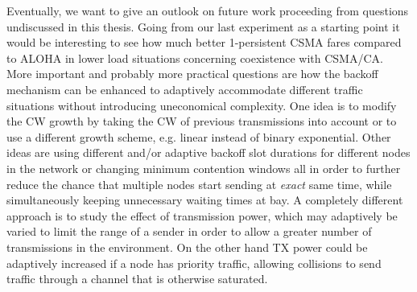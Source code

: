 Eventually, we want to give an outlook on future work proceeding from questions undiscussed in this thesis. Going from our last experiment as a starting point it would be interesting to see how much better 1-persistent CSMA fares compared to ALOHA in lower load situations concerning coexistence with CSMA/CA. More important and probably more practical questions are how the backoff mechanism can be enhanced to adaptively accommodate different traffic situations without introducing uneconomical complexity. One idea is to modify the CW growth by taking the CW of previous transmissions into account or to use a different growth scheme, e.g. linear instead of binary exponential. Other ideas are using different and/or adaptive backoff slot durations for different nodes in the network or changing minimum contention windows all in order to further reduce the chance that multiple nodes start sending at \emph{exact} same time, while simultaneously keeping unnecessary waiting times at bay. A completely different approach is to study the effect of transmission power, which may adaptively be varied to limit the range of a sender in order to allow a greater number of transmissions in the environment. On the other hand TX power could be adaptively increased if a node has priority traffic, allowing collisions to send traffic through a channel that is otherwise saturated. 
